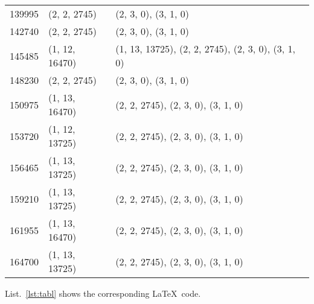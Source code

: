 \begin{center}
{\begin{tabularx}{\textwidth}{p{}|p{}|p{}}
139995 & (2, 2, 2745) & (2, 3, 0), (3, 1, 0) \\
142740 & (2, 2, 2745) & (2, 3, 0), (3, 1, 0) \\
145485 & (1, 12, 16470) & (1, 13, 13725), (2, 2, 2745), (2, 3, 0), (3, 1, 0) \\
148230 & (2, 2, 2745) & (2, 3, 0), (3, 1, 0) \\
150975 & (1, 13, 16470) & (2, 2, 2745), (2, 3, 0), (3, 1, 0) \\
153720 & (1, 12, 13725) & (2, 2, 2745), (2, 3, 0), (3, 1, 0) \\
156465 & (1, 13, 13725) & (2, 2, 2745), (2, 3, 0), (3, 1, 0) \\
159210 & (1, 13, 13725) & (2, 2, 2745), (2, 3, 0), (3, 1, 0) \\
161955 & (1, 13, 16470) & (2, 2, 2745), (2, 3, 0), (3, 1, 0) \\
164700 & (1, 13, 13725) & (2, 2, 2745), (2, 3, 0), (3, 1, 0) \\
\hline 
\end{tabularx}
}
\end{center}
\cleardoublepage









List.~\ref{lst:tabl} shows the corresponding \LaTeX \ code. 

